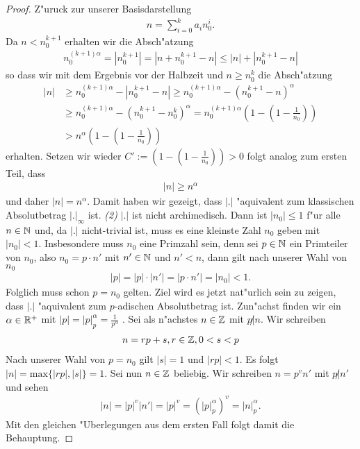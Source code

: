 \begin{proof}
		Z"uruck zur unserer Basisdarstellung
		\begin{align*}
			n = \sum_{i=0}^{k} a_i n_0^i.
		\end{align*}
		Da $n < n_0^{k+1}$ erhalten wir die Absch"atzung
		\begin{align*}
			n_0^{(k+1)\alpha}=|n_0^{k+1}| = |n + n_0^{k+1} - n| \leq |n| + |n_0^{k+1} -n|
		\end{align*}
		so dass wir mit dem Ergebnis vor der Halbzeit und $n\geq n_0^k$ die Absch"atzung
		\begin{align*}
			|n| &\geq n_0^{(k+1)\alpha} - |n_0^{k+1} -n| 
				\geq n_0^{(k+1)\alpha} - (n_0^{k+1} -n)^\alpha
				\\&\geq n_0^{(k+1)\alpha} - (n_0^{k+1} -n_0^k)^\alpha
				=n_0^{(k+1)\alpha} \left(1 - \left(1 - \frac{1}{n_0}\right)\right)
				\\&> n^\alpha \left(1 - \left(1 - \frac{1}{n_0}\right)\right)
		\end{align*}
		erhalten. Setzen wir wieder $C':=\left(1 - \left(1 - \frac{1}{n_0}\right)\right) >0$ folgt analog zum ersten Teil, dass
		\begin{align*} 
			|n|\geq n^\alpha
		\end{align*}
		und daher $|n|=n^\alpha$. Damit haben wir gezeigt, dass $|.|$ "aquivalent zum klassischen Absolutbetrag $|.|_\infty$ ist.
		\textit{(2)} $|.|$ ist nicht archimedisch.
		Dann ist $|n_0|\leq 1$ f"ur alle $n \in \mathbb{N}$ und, da $|.|$ nicht-trivial ist, muss es eine kleinste Zahl $n_0$ geben mit $|n_0|<1$. Insbesondere muss $n_0$ eine Primzahl sein, denn sei $p \in \mathbb{N}$ ein Primteiler von $n_0$, also $n_0=p \cdot n'$ mit $n' \in \mathbb{N}$ und $n' < n$, dann gilt nach unserer Wahl von $n_0$
		\begin{align*}
			|p| = |p|\cdot |n'| =|p \cdot n'| = |n_0| < 1.
		\end{align*}
		Folglich muss schon $p=n_0$ gelten. Ziel wird es jetzt nat"urlich sein zu zeigen, dass $|.|$ "aquivalent zum $p$-adischen Absolutbetrag ist.
		Zun"achst finden wir ein $\alpha \in \mathbb{R}^+$ mit $|p| = |p|_p^{\alpha} = \frac{1}{p^{\alpha}}$ . Sei als n"achstes $n\in \mathbb{Z}$ mit $p \not | n$. Wir schreiben
		\begin{align*}
			n= rp + s, r \in \mathbb{Z}, 0<s<p
		\end{align*}
		Nach unserer Wahl von $p=n_0$ gilt $|s|=1$ und $|rp|<1$. Es folgt $|n|=\text{max}\{|rp|,|s|\}=1$. Sei nun $n\in \mathbb{Z}$ beliebig. Wir schreiben $n=p^{v}n'$ mit $p\not | n'$ und sehen
		\begin{align*}
			|n| = |p|^{v}|n'| = |p|^v = (|p|_p^{\alpha})^{v}=|n|_p^{\alpha}.
		\end{align*}
		Mit den gleichen "Uberlegungen aus dem ersten Fall folgt damit die Behauptung.
	\end{proof}